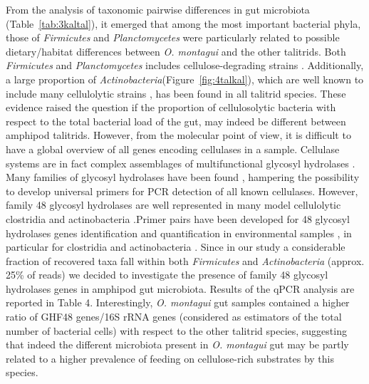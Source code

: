 From the analysis of taxonomic pairwise differences in gut microbiota (Table~\ref{tab:3kaltal}), it emerged that among the most important bacterial phyla, those of \textit{Firmicutes} and \textit{Planctomycetes} were particularly related to possible dietary/habitat differences between \textit{O. montagui} and the other talitrids. Both \textit{Firmicutes} and \textit{Planctomycetes} includes cellulose-degrading strains \cite{kulichevskaya2007schlesneria, schwarz2001cellulosome}. Additionally, a large proportion of \textit{Actinobacteria}(Figure~\ref{fig:4talkal}), which are well known to include many cellulolytic strains \cite{ljungdahl1985ecology}, has been found in all talitrid species. These evidence raised the question if the proportion of cellulosolytic bacteria with respect to the total bacterial load of the gut, may indeed be different between amphipod talitrids. However, from the molecular point of view, it is difficult to have a global overview of all genes encoding cellulases in a sample. Cellulase systems are in fact complex assemblages of multifunctional glycosyl hydrolases \cite{schwarz2001cellulosome}. Many families of glycosyl hydrolases have been found \cite{lynd2002microbial}, hampering the possibility to develop universal primers for PCR detection of all known cellulases. However, family 48 glycosyl hydrolases are well represented in many model cellulolytic clostridia and actinobacteria \cite{lynd2002microbial, beloqui2010diversity}.Primer pairs have been developed for 48 glycosyl hydrolases genes identification and quantification in environmental samples \cite{izquierdo2010diversity,pereyra2010detection}, in particular for clostridia and actinobacteria \cite{izquierdo2010diversity}. Since in our study a considerable fraction of recovered taxa fall within both \textit{Firmicutes} and \textit{Actinobacteria} (approx. 25\% of reads) we decided to investigate the presence of family 48 glycosyl hydrolases genes in amphipod gut microbiota. Results of the qPCR analysis are reported in Table 4. Interestingly, \textit{O. montagui} gut samples contained a higher ratio of GHF48 genes/16S rRNA genes (considered as estimators of the total number of bacterial cells) with respect to the other talitrid species, suggesting that indeed the different microbiota present in \textit{O. montagui} gut may be partly related to a higher prevalence of feeding on cellulose-rich substrates by this species.\\

